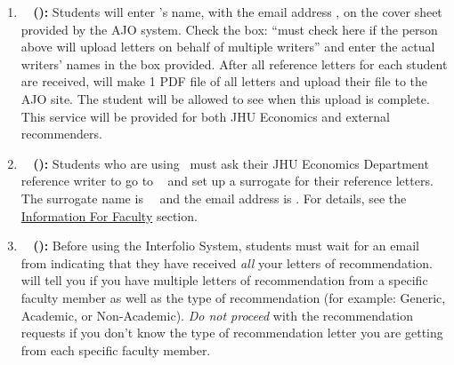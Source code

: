 \documentclass{\econtex}
\begin{document}
\begin{enumerate}
\begin{itemize}
  \end{itemize}

\item \textbf{\AJO ~ (\AJOLink):}
  Students will enter {\JMStaffName}'s name, with the email address \jmstaffemail, on the cover sheet provided by the AJO system. Check the box: ``must check here if the person above will upload letters on behalf of multiple writers'' and enter the actual writers' names in the box provided. After all reference letters for each student are received, {\JMStaffName} will make 1 PDF file of all letters and upload their file to the AJO site. The student will be allowed to see when this upload is complete. This service will be provided for both JHU Economics and external recommenders.

\item \textbf{\AEA ~ (\AEALink):}
  Students who are using \AEA~must ask their JHU Economics Department reference writer to go to \AEARecLink~ and set up a surrogate for their reference letters. The surrogate name is {\JMStaffName}~{\JMStaffNameLast}~and the email address is \jmstaffemail. %
  For details, see the \href{\pageurl/RecLetters#information-for-faculty}{Information For Faculty} section.
  
  \hypertarget{students-interfolio}{}
\item \textbf{\Interfolio ~ (\InterfolioLink):}
  Before using the Interfolio System, students must wait for an email from {\JMStaffName} indicating that they have received \textit{all} your letters of recommendation. {\JMStaffName} will tell you if you have multiple letters of recommendation from a specific faculty member as well as the type of recommendation (for example: Generic, Academic, or Non-Academic). \textit{Do not proceed} with the recommendation requests if you don't know the type of recommendation letter you are getting from each specific faculty member.


\end{enumerate}
\end{document}
